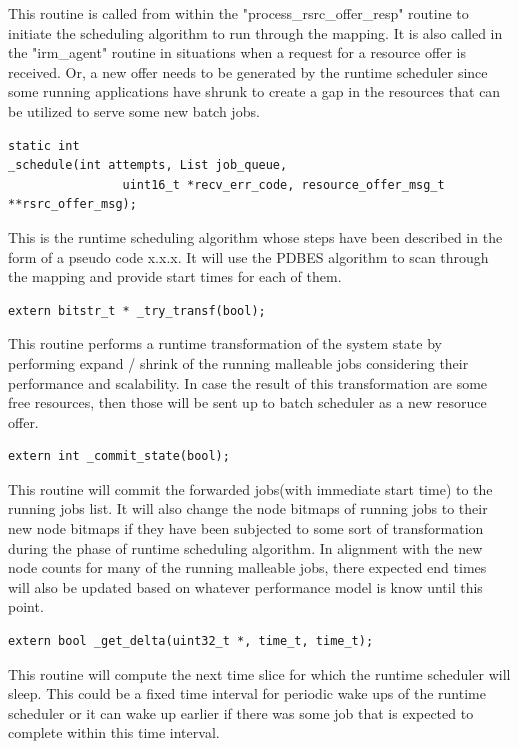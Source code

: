 This routine is called from within the "process\_rsrc\_offer\_resp" routine to initiate the scheduling algorithm to run through the mapping. It is also called in the "irm\_agent" routine in situations when a request for a resource offer is received. Or, a new offer needs to be generated by the runtime scheduler since some running applications have shrunk to create a gap in the resources that can be utilized to serve some new batch jobs.\\
\begin{lstlisting}[mathescape,frame=single]
static int 
_schedule(int attempts, List job_queue,
                uint16_t *recv_err_code, resource_offer_msg_t **rsrc_offer_msg);
\end{lstlisting}
This is the runtime scheduling algorithm whose steps have been described in the form of a pseudo code x.x.x. It will use the PDBES algorithm to scan through the mapping and provide start times for each of them.\\
\begin{lstlisting}[mathescape,frame=single]
extern bitstr_t * _try_transf(bool);
\end{lstlisting}
This routine performs a runtime transformation of the system state by performing expand / shrink of the running malleable jobs considering their performance and scalability. In case the result of this transformation are some free resources, then those will be sent up to batch scheduler as a new resoruce offer.\\
\begin{lstlisting}[mathescape,frame=single]
extern int _commit_state(bool);
\end{lstlisting}
This routine will commit the forwarded jobs(with immediate start time) to the running jobs list. It will also change the node bitmaps of running jobs to their new node bitmaps if they have been subjected to some sort of transformation during the phase of runtime scheduling algorithm. In alignment with the new node counts for many of the running malleable jobs, there expected end times will also be updated based on whatever performance model is know until this point.\\
\begin{lstlisting}[mathescape,frame=single]
extern bool _get_delta(uint32_t *, time_t, time_t);
\end{lstlisting}
This routine will compute the next time slice for which the runtime scheduler will sleep. This could be a fixed time interval for periodic wake ups of the runtime scheduler or it can wake up earlier if there was some job that is expected to complete within this time interval.
